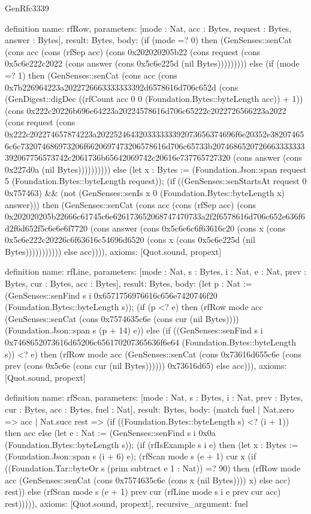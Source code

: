 \begin{lexlean}{GenRfc3339}
\begin{semanticmodule}
definition{
  name: rfRow,
  parameters: [mode : Nat, acc : Bytes, request : Bytes, answer : Bytes],
  result: Bytes,
  body: (if (mode =? 0) then (GenSenses::senCat (cons acc (cons (rfSep acc) (cons 0x202020205b22 (cons request (cons 0x5c6e222c2022 (cons answer (cons 0x5c6e225d (nil Bytes))))))))) else (if (mode =? 1) then (GenSenses::senCat (cons acc (cons 0x7b226964223a2022726663333333392d6578616d706c652d (cons (GenDigest::digDec ((rfCount acc 0 0 (Foundation.Bytes::byteLength acc)) + 1)) (cons 0x222c20226b696e64223a20224578616d706c65222c2022726566223a2022 (cons request (cons 0x222c202274657874223a202252464320333333392073656374696f6e20352e382074656c6c732074686973206f6620697473206578616d706c65733b2074686520726663333333392067756573742c2061736b65642069742c20616e737765727320 (cons answer (cons 0x227d0a (nil Bytes)))))))))) else (let x : Bytes := (Foundation.Json::span request 5 (Foundation.Bytes::byteLength request)); (if ((GenSenses::senStartsAt request 0 0x757463) && (not (GenSenses::senIs x 0 (Foundation.Bytes::byteLength x) answer))) then (GenSenses::senCat (cons acc (cons (rfSep acc) (cons 0x202020205b22666c61745c6e626173652068747470733a2f2f6578616d706c652e636f6d2f6d652f5c6e6e6f7720 (cons answer (cons 0x5c6e6c6f63616c20 (cons x (cons 0x5c6e222c20226c6f63616c54696d6520 (cons x (cons 0x5c6e225d (nil Bytes))))))))))) else acc)))),
  axioms: [Quot.sound, propext]
}

definition{
  name: rfLine,
  parameters: [mode : Nat, s : Bytes, i : Nat, e : Nat, prev : Bytes, cur : Bytes, acc : Bytes],
  result: Bytes,
  body: (let p : Nat := (GenSenses::senFind s i 0x6571756976616c656e7420746f20 (Foundation.Bytes::byteLength s)); (if (p <? e) then (rfRow mode acc (GenSenses::senCat (cons 0x7574635c6e (cons cur (nil Bytes)))) (Foundation.Json::span s (p + 14) e)) else (if ((GenSenses::senFind s i 0x7468652073616d65206c656170207365636f6e64 (Foundation.Bytes::byteLength s)) <? e) then (rfRow mode acc (GenSenses::senCat (cons 0x73616d655c6e (cons prev (cons 0x5c6e (cons cur (nil Bytes)))))) 0x73616d65) else acc))),
  axioms: [Quot.sound, propext]
}

definition{
  name: rfScan,
  parameters: [mode : Nat, s : Bytes, i : Nat, prev : Bytes, cur : Bytes, acc : Bytes, fuel : Nat],
  result: Bytes,
  body: (match fuel
    | Nat.zero => acc
    | Nat.succ rest => (if ((Foundation.Bytes::byteLength s) <? (i + 1)) then acc else (let e : Nat := (GenSenses::senFind s i 0x0a (Foundation.Bytes::byteLength s)); (if (rfIsExample s i e) then (let x : Bytes := (Foundation.Json::span s (i + 6) e); (rfScan mode s (e + 1) cur x (if ((Foundation.Tar::byteOr s (prim subtract e 1 : Nat)) =? 90) then (rfRow mode acc (GenSenses::senCat (cons 0x7574635c6e (cons x (nil Bytes)))) x) else acc) rest)) else (rfScan mode s (e + 1) prev cur (rfLine mode s i e prev cur acc) rest))))),
  axioms: [Quot.sound, propext],
  recursive_argument: fuel
}


\end{semanticmodule}
\end{lexlean}
